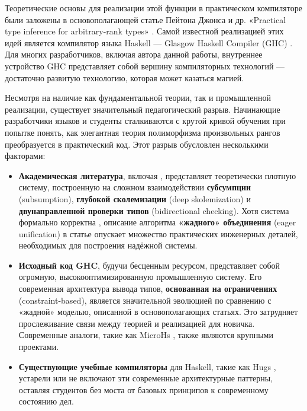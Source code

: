 \enlargethispage{\baselineskip}
Теоретические основы для реализации этой функции в практическом компиляторе были заложены в основополагающей статье Пейтона Джонса и др. «Practical type inference for arbitrary-rank types» \cite{jones-practical-2007}. Самой известной реализацией этих идей является компилятор языка Haskell — Glasgow Haskell Compiler (GHC) \cite{ghc-site-2025}. Для многих разработчиков, включая автора данной работы, внутреннее устройство GHC представляет собой вершину компиляторных технологий — достаточно развитую технологию, которая может казаться магией.

Несмотря на наличие как фундаментальной теории, так и промышленной реализации, существует значительный педагогический разрыв. Начинающие разработчики языков и студенты сталкиваются с крутой кривой обучения при попытке понять, как элегантная теория полиморфизма произвольных рангов преобразуется в практический код. Этот разрыв обусловлен несколькими факторами:
\begin{itemize}
    \item \textbf{Академическая литература}, включая \cite{jones-practical-2007}, представляет теоретически плотную систему, построенную на сложном взаимодействии \textbf{субсумпции} (subsumption), \textbf{глубокой сколемизации} (deep skolemization) и \textbf{двунаправленной проверки типов} (bidirectional checking). Хотя система формально корректна \cite{practical-type-inference-proofs}, описание алгоритма \textbf{«жадного» объединения} (eager unification) в статье опускает множество практических инженерных деталей, необходимых для построения надёжной системы.
    \item \textbf{Исходный код GHC}, будучи бесценным ресурсом, представляет собой огромную, высокооптимизированную промышленную систему. Его современная архитектура вывода типов, \textbf{основанная на ограничениях} (constraint-based), является значительной эволюцией по сравнению с «жадной» моделью, описанной в основополагающих статьях. Это затрудняет прослеживание связи между теорией и реализацией для новичка. Современные аналоги, такие как MicroHs \cite{augustsson-microhs-2024, augustss-microhs-2025}, также являются крупными проектами.
    \item \textbf{Существующие учебные компиляторы} для Haskell, такие как Hugs \cite{hugs-haskell}, устарели или не включают эти современные архитектурные паттерны, оставляя студентов без моста от базовых принципов к современному состоянию дел.
\end{itemize}

